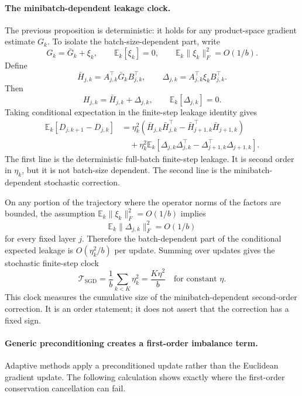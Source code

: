 \documentclass{article}
\begin{document}
\paragraph{The minibatch-dependent leakage clock.}
The previous proposition is deterministic: it holds for any product-space
gradient estimate \(G_k\).  To isolate the batch-size-dependent part,
write
\[
    G_k=\bar G_k+\xi_k,
    \qquad
    \mathbb E_k[\xi_k]=0,
    \qquad
    \mathbb E_k\|\xi_k\|_F^2=O(1/b).
\]
Define
\[
    \bar H_{j,k}
    =
    A_{j,k}^\top \bar G_k B_{j,k}^\top,
    \qquad
    \Delta_{j,k}
    =
    A_{j,k}^\top \xi_k B_{j,k}^\top.
\]
Then
\[
    H_{j,k}=\bar H_{j,k}+\Delta_{j,k},
    \qquad
    \mathbb E_k[\Delta_{j,k}]=0.
\]
Taking conditional expectation in the finite-step leakage identity gives
\[
\begin{aligned}
    \mathbb E_k[D_{j,k+1}-D_{j,k}]
    &=
    \eta_k^2
    \left(
        \bar H_{j,k}\bar H_{j,k}^\top
        -
        \bar H_{j+1,k}^\top\bar H_{j+1,k}
    \right) \\
    &\quad
    +
    \eta_k^2
    \mathbb E_k
    \left[
        \Delta_{j,k}\Delta_{j,k}^\top
        -
        \Delta_{j+1,k}^\top\Delta_{j+1,k}
    \right].
\end{aligned}
\]
The first line is the deterministic full-batch finite-step leakage.  It
is second order in \(\eta_k\), but it is not batch-size dependent.  The
second line is the minibatch-dependent stochastic correction.

On any portion of the trajectory where the operator norms of the factors
are bounded, the assumption
\(\mathbb E_k\|\xi_k\|_F^2=O(1/b)\) implies
\[
    \mathbb E_k\|\Delta_{j,k}\|_F^2=O(1/b)
\]
for every fixed layer \(j\).  Therefore the batch-dependent part of the
conditional expected leakage is \(O(\eta_k^2/b)\) per update.  Summing
over updates gives the stochastic finite-step clock
\[
    \mathcal T_{\mathrm{SGD}}
    =
    \frac{1}{b}\sum_{k<K}\eta_k^2
    =
    \frac{K\eta^2}{b}
    \quad\text{for constant \(\eta\)}.
\]
This clock measures the cumulative size of the minibatch-dependent
second-order correction.  It is an order statement; it does not assert
that the correction has a fixed sign.

\paragraph{Generic preconditioning creates a first-order imbalance term.}
Adaptive methods apply a preconditioned update rather than the Euclidean
gradient update.  The following calculation shows exactly where the
first-order conservation cancellation can fail.
\end{document}
